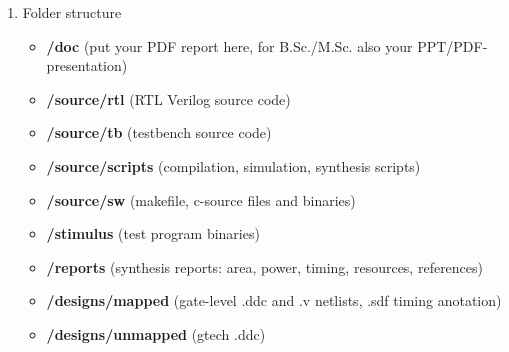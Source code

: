 \begin{enumerate}
	\item Folder structure
	\begin{itemize}
		\item \textbf{/doc}							(put your PDF report here, for B.Sc./M.Sc. also your PPT/PDF-presentation)
		\item \textbf{/source/rtl}					(RTL Verilog source code)
		\item \textbf{/source/tb}					(testbench source code)
		\item \textbf{/source/scripts}			(compilation, simulation, synthesis scripts)
		\item \textbf{/source/sw}				(makefile, c-source files and binaries)
		\item \textbf{/stimulus}					(test program binaries)
		\item \textbf{/reports}						(synthesis reports: area, power, timing, resources, references)
		\item \textbf{/designs/mapped}		(gate-level .ddc and .v netlists, .sdf timing anotation)
		\item \textbf{/designs/unmapped}	(gtech .ddc)
	\end{itemize}
	

\end{enumerate}
